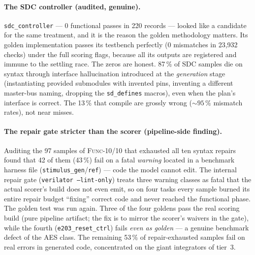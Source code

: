 \paragraph{The SDC controller (audited, genuine).}
\texttt{sdc\_controller} --- 0 functional passes in 220 records --- looked
like a candidate for the same treatment, and it is the reason the golden
methodology matters. Its golden implementation passes its testbench
perfectly (0 mismatches in 23{,}932 checks) under the full scoring flags,
because all its outputs are registered and immune to the settling race.
The zeros are honest. 87\,\% of SDC samples die on syntax through
interface hallucination introduced at the \emph{generation} stage
(instantiating provided submodules with invented pins, inventing a
different master-bus naming, dropping the \texttt{sd\_defines} macros), even
when the plan's interface is correct. The 13\,\% that compile are
grossly wrong (${\sim}95\,\%$ mismatch rates), not near misses.

\paragraph{The repair gate stricter than the scorer (pipeline-side finding).}
Auditing the 97 samples of \textsc{Func-10/10} that exhausted all ten
syntax repairs found that 42 of them (43\,\%) fail on a fatal
\emph{warning} located in a benchmark harness file
(\texttt{stimulus\_gen}/\texttt{ref}) --- code the model cannot edit. The
internal repair gate (\texttt{verilator --lint-only}) treats three warning
classes as fatal that the actual scorer's build does not even emit, so on
four tasks every sample burned its entire repair budget ``fixing''
correct code and never reached the functional phase. The golden test was run again.
Three of the four goldens pass the real scoring build (pure pipeline
artifact; the fix is to mirror the scorer's waivers in the gate), while
the fourth (\texttt{e203\_reset\_ctrl}) fails \emph{even as golden} ---
a genuine benchmark defect of the AES class. The remaining 53\,\% of
repair-exhausted samples fail on real errors in generated code,
concentrated on the giant integrators of tier~3.

